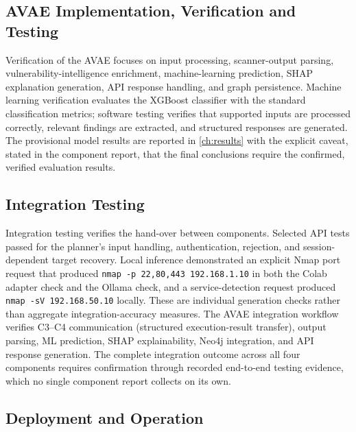 \subsection{AVAE Implementation, Verification and Testing}\label{sec:testing-avae}

\begin{sloppypar}
Verification of the AVAE focuses on input processing, scanner-output parsing,
vulnerability-intelligence enrichment, machine-learning prediction, SHAP
explanation generation, API response handling, and graph persistence. Machine
learning verification evaluates the XGBoost classifier with the standard
classification metrics; software testing verifies that supported inputs are
processed correctly, relevant findings are extracted, and structured responses
are generated. The provisional model results are reported in \cref{ch:results}
with the explicit caveat, stated in the component report, that the final
conclusions require the confirmed, verified evaluation results.
\end{sloppypar}

\subsection{Integration Testing}\label{sec:testing-integration}

Integration testing verifies the hand-over between components. Selected API
tests passed for the planner's input handling, authentication, rejection, and
session-dependent target recovery. Local inference demonstrated an explicit Nmap
port request that produced \texttt{nmap -p 22,80,443 192.168.1.10} in both the
Colab adapter check and the Ollama check, and a service-detection request
produced \texttt{nmap -sV 192.168.50.10} locally. These are individual
generation checks rather than aggregate integration-accuracy measures. The AVAE
integration workflow verifies C3--C4 communication (structured execution-result
transfer), output parsing, ML prediction, SHAP explainability, Neo4j
integration, and API response generation. The complete integration outcome
across all four components requires confirmation through recorded end-to-end
testing evidence, which no single component report collects on its own.

\subsection{Deployment and Operation}\label{sec:testing-deploy}

